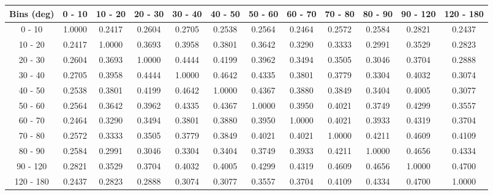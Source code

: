 \documentclass[aps, prd, reprint,showpacs,  preprintnumbers,amsmath,amssymb,superscriptaddress, nofootinbib]{revtex4-1}
\makeatletter
\renewenvironment{table}
  {\def\@captype{table}}
  {}
\makeatother
\begin{document}
\begin{table}
\centering
\begin{tabular}{cccccccccccc}
\hline
Bins (deg) & 0 - 10 & 10 - 20 & 20 - 30 & 30 - 40 & 40 - 50 & 50 - 60 & 60 - 70 & 70 - 80 & 80 - 90 & 90 - 120 & 120 - 180  \\ 
\hline
  0 -  10    &     1.0000  &     0.2417  &     0.2604  &     0.2705  &     0.2538  &     0.2564  &     0.2464  &     0.2572  &     0.2584  &     0.2821  &     0.2437 \\ 
 10 -  20    &     0.2417  &     1.0000  &     0.3693  &     0.3958  &     0.3801  &     0.3642  &     0.3290  &     0.3333  &     0.2991  &     0.3529  &     0.2823 \\ 
 20 -  30    &     0.2604  &     0.3693  &     1.0000  &     0.4444  &     0.4199  &     0.3962  &     0.3494  &     0.3505  &     0.3046  &     0.3704  &     0.2888 \\ 
 30 -  40    &     0.2705  &     0.3958  &     0.4444  &     1.0000  &     0.4642  &     0.4335  &     0.3801  &     0.3779  &     0.3304  &     0.4032  &     0.3074 \\ 
 40 -  50    &     0.2538  &     0.3801  &     0.4199  &     0.4642  &     1.0000  &     0.4367  &     0.3880  &     0.3849  &     0.3404  &     0.4005  &     0.3077 \\ 
 50 -  60    &     0.2564  &     0.3642  &     0.3962  &     0.4335  &     0.4367  &     1.0000  &     0.3950  &     0.4021  &     0.3749  &     0.4299  &     0.3557 \\ 
 60 -  70    &     0.2464  &     0.3290  &     0.3494  &     0.3801  &     0.3880  &     0.3950  &     1.0000  &     0.4021  &     0.3933  &     0.4319  &     0.3704 \\ 
 70 -  80    &     0.2572  &     0.3333  &     0.3505  &     0.3779  &     0.3849  &     0.4021  &     0.4021  &     1.0000  &     0.4211  &     0.4609  &     0.4109 \\ 
 80 -  90    &     0.2584  &     0.2991  &     0.3046  &     0.3304  &     0.3404  &     0.3749  &     0.3933  &     0.4211  &     1.0000  &     0.4656  &     0.4334 \\ 
 90 - 120    &     0.2821  &     0.3529  &     0.3704  &     0.4032  &     0.4005  &     0.4299  &     0.4319  &     0.4609  &     0.4656  &     1.0000  &     0.4700 \\ 
120 - 180    &     0.2437  &     0.2823  &     0.2888  &     0.3074  &     0.3077  &     0.3557  &     0.3704  &     0.4109  &     0.4334  &     0.4700  &     1.0000 \\ 
\hline
\hline
\end{tabular}
\caption{Correlation matrix for bins of $d\sigma/d\theta_\pi$.}
\label{tb:pi0_theta_cov}
\end{table}




\end{document}
